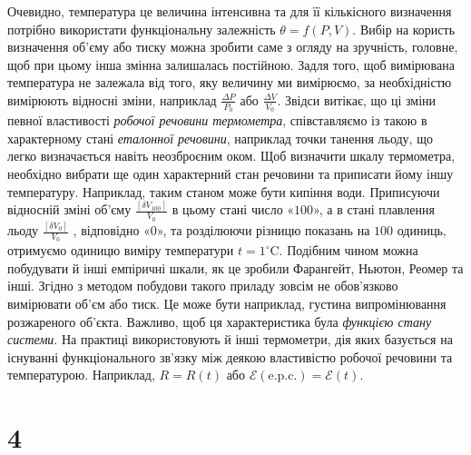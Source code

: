Очевидно, температура це величина інтенсивна та для її кількісного визначення потрібно використати функціональну залежність $\theta = f(P, V)$. Вибір на користь визначення об'єму або тиску можна зробити саме з огляду на зручність, головне, щоб при цьому інша змінна залишалась постійною. Задля того, щоб вимірювана температура не залежала від того, яку величину ми вимірюємо, за необхідністю вимірюють відносні зміни, наприклад $\frac{\Delta P}{P_0}$  або  $\frac{\Delta V}{V_0}$. Звідси витікає, що ці зміни певної властивості \emph{робочої речовини термометра}, співставляємо із такою в характерному стані \emph{еталонної речовини}, наприклад точки танення льоду, що легко визначається навіть неозброєним оком. Щоб визначити шкалу термометра, необхідно вибрати ще один характерний стан речовини та приписати йому іншу температуру. Наприклад, таким станом може бути кипіння води. Приписуючи відносній зміні об’єму $\frac{[\delta V_{100}]}{V_0}$  в цьому стані число «$100$», а в стані плавлення льоду $\frac{[\delta V_{0}]}{V_0}$ , відповідно «$0$», та розділюючи різницю показань на $100$ одиниць, отримуємо одиницю виміру температури $t = 1^\circ$C. Подібним чином можна побудувати й інші емпіричні шкали, як це зробили Фарангейт, Ньютон, Реомер та інші. Згідно з методом побудови такого приладу зовсім не обов'язково вимірювати об'єм або тиск. Це може бути наприклад, густина випромінювання розжареного об'єкта. Важливо, щоб ця характеристика була \emph{функцією стану системи}. На практиці використовують й інші термометри, дія яких базується на існуванні функціонального зв'язку між деякою властивістю робочої речовини та температурою. Наприклад, $R=R(t)$  або $\mathcal{E}(\text{e.p.c.})=\mathcal{E}(t)$.





\section{4}





